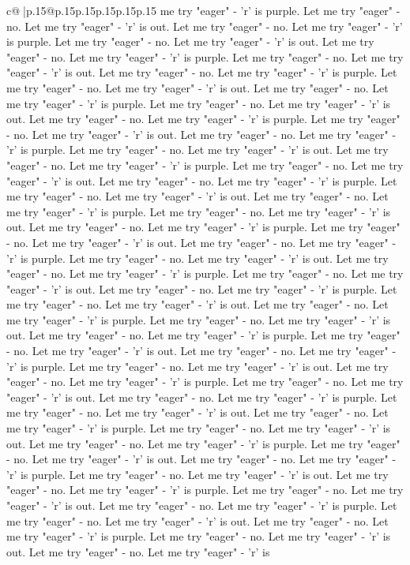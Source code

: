 \documentclass{article}
\begin{document}
{\begin{supertabular}{c@{$\;$}|p{.15\linewidth}@{}p{.15\linewidth}p{.15\linewidth}p{.15\linewidth}p{.15\linewidth}p{.15\linewidth}}
{{{me try "eager" {-} 'r' is purple. Let me try "eager" {-} no. Let me try "eager" {-} 'r' is out. Let me try "eager" {-} no. Let me try "eager" {-} 'r' is purple. Let me try "eager" {-} no. Let me try "eager" {-} 'r' is out. Let me try "eager" {-} no. Let me try "eager" {-} 'r' is purple. Let me try "eager" {-} no. Let me try "eager" {-} 'r' is out. Let me try "eager" {-} no. Let me try "eager" {-} 'r' is purple. Let me try "eager" {-} no. Let me try "eager" {-} 'r' is out. Let me try "eager" {-} no. Let me try "eager" {-} 'r' is purple. Let me try "eager" {-} no. Let me try "eager" {-} 'r' is out. Let me try "eager" {-} no. Let me try "eager" {-} 'r' is purple. Let me try "eager" {-} no. Let me try "eager" {-} 'r' is out. Let me try "eager" {-} no. Let me try "eager" {-} 'r' is purple. Let me try "eager" {-} no. Let me try "eager" {-} 'r' is out. Let me try "eager" {-} no. Let me try "eager" {-} 'r' is purple. Let me try "eager" {-} no. Let me try "eager" {-} 'r' is out. Let me try "eager" {-} no. Let me try "eager" {-} 'r' is purple. Let me try "eager" {-} no. Let me try "eager" {-} 'r' is out. Let me try "eager" {-} no. Let me try "eager" {-} 'r' is purple. Let me try "eager" {-} no. Let me try "eager" {-} 'r' is out. Let me try "eager" {-} no. Let me try "eager" {-} 'r' is purple. Let me try "eager" {-} no. Let me try "eager" {-} 'r' is out. Let me try "eager" {-} no. Let me try "eager" {-} 'r' is purple. Let me try "eager" {-} no. Let me try "eager" {-} 'r' is out. Let me try "eager" {-} no. Let me try "eager" {-} 'r' is purple. Let me try "eager" {-} no. Let me try "eager" {-} 'r' is out. Let me try "eager" {-} no. Let me try "eager" {-} 'r' is purple. Let me try "eager" {-} no. Let me try "eager" {-} 'r' is out. Let me try "eager" {-} no. Let me try "eager" {-} 'r' is purple. Let me try "eager" {-} no. Let me try "eager" {-} 'r' is out. Let me try "eager" {-} no. Let me try "eager" {-} 'r' is purple. Let me try "eager" {-} no. Let me try "eager" {-} 'r' is out. Let me try "eager" {-} no. Let me try "eager" {-} 'r' is purple. Let me try "eager" {-} no. Let me try "eager" {-} 'r' is out. Let me try "eager" {-} no. Let me try "eager" {-} 'r' is purple. Let me try "eager" {-} no. Let me try "eager" {-} 'r' is out. Let me try "eager" {-} no. Let me try "eager" {-} 'r' is purple. Let me try "eager" {-} no. Let me try "eager" {-} 'r' is out. Let me try "eager" {-} no. Let me try "eager" {-} 'r' is purple. Let me try "eager" {-} no. Let me try "eager" {-} 'r' is out. Let me try "eager" {-} no. Let me try "eager" {-} 'r' is purple. Let me try "eager" {-} no. Let me try "eager" {-} 'r' is out. Let me try "eager" {-} no. Let me try "eager" {-} 'r' is purple. Let me try "eager" {-} no. Let me try "eager" {-} 'r' is out. Let me try "eager" {-} no. Let me try "eager" {-} 'r' is purple. Let me try "eager" {-} no. Let me try "eager" {-} 'r' is out. Let me try "eager" {-} no. Let me try "eager" {-} 'r' is purple. Let me try "eager" {-} no. Let me try "eager" {-} 'r' is out. Let me try "eager" {-} no. Let me try "eager" {-} 'r' is purple. Let me try "eager" {-} no. Let me try "eager" {-} 'r' is out. Let me try "eager" {-} no. Let me try "eager" {-} 'r' is }}}
\end{supertabular}}
\end{document}
